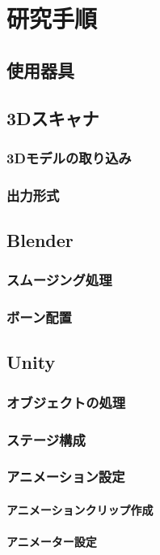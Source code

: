 \documentclass{ltjsreport}
\begin{document}
\chapter{研究手順}
	\section{使用器具}
	\section{3Dスキャナ}
		\subsection{3Dモデルの取り込み}
		\subsection{出力形式}
	\section{Blender}
		\subsection{スムージング処理}
		\subsection{ボーン配置}
	\section{Unity}
		\subsection{オブジェクトの処理}
		\subsection{ステージ構成}
		\subsection{アニメーション設定}
			\subsubsection{アニメーションクリップ作成}
			\subsubsection{アニメーター設定}
\end{document}
